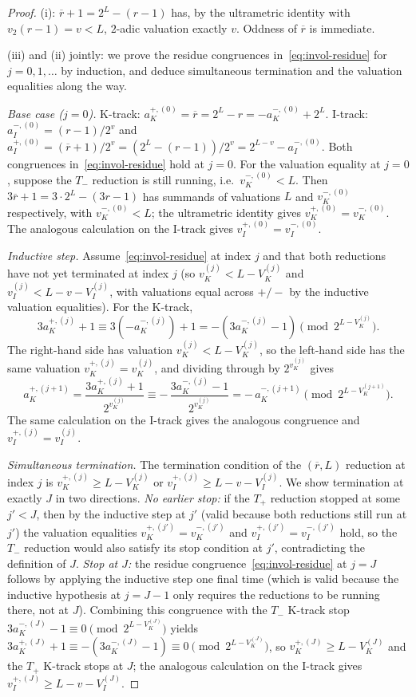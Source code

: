 \documentclass[11pt,reqno]{amsart}
\theoremstyle{plain}
\theoremstyle{definition}
\theoremstyle{remark}
\newcommand{\Tplus}{T_{+}}
\newcommand{\Tminus}{T_{-}}
\newcommand{\Vk}{V_{K}}
\newcommand{\Vi}{V_{I}}
\newcommand{\vk}{v_{K}}
\newcommand{\vi}{v_{I}}
\newcommand{\vtwo}{v_{2}}
\begin{document}
\begin{proof}
(i): $\overline{r} + 1 = 2^L - (r - 1)$ has, by the ultrametric identity
with $\vtwo(r-1) = v < L$, $2$-adic valuation exactly $v$. Oddness of
$\overline{r}$ is immediate.

(iii) and (ii) jointly: we prove the residue congruences
in~\eqref{eq:invol-residue} for $j = 0, 1, \ldots$ by induction, and
deduce simultaneous termination and the valuation equalities along the
way.

\emph{Base case ($j = 0$).} K-track:
$a_K^{+,(0)} = \overline{r} = 2^L - r = -a_K^{-,(0)} + 2^L$.
I-track: $a_I^{-,(0)} = (r-1)/2^v$ and
$a_I^{+,(0)} = (\overline{r}+1)/2^v = (2^L - (r-1))/2^v = 2^{L-v} - a_I^{-,(0)}$.
Both congruences in~\eqref{eq:invol-residue} hold at $j = 0$. For the
valuation equality at $j = 0$, suppose the $\Tminus$ reduction is still
running, i.e.\ $\vk^{-,(0)} < L$. Then
$3 \overline{r} + 1 = 3 \cdot 2^L - (3 r - 1)$ has summands of
valuations $L$ and $\vk^{-,(0)}$ respectively, with $\vk^{-,(0)} < L$;
the ultrametric identity gives $\vk^{+,(0)} = \vk^{-,(0)}$. The
analogous calculation on the I-track gives $\vi^{+,(0)} = \vi^{-,(0)}$.

\emph{Inductive step.} Assume~\eqref{eq:invol-residue} at index $j$ and
that both reductions have not yet terminated at index $j$
(so $\vk^{(j)} < L - \Vk^{(j)}$ and $\vi^{(j)} < L - v - \Vi^{(j)}$,
with valuations equal across $+/-$ by the inductive valuation
equalities). For the K-track,
\[
3 a_K^{+,(j)} + 1 \equiv 3 (-a_K^{-,(j)}) + 1 = -(3 a_K^{-,(j)} - 1)
\pmod{2^{L - \Vk^{(j)}}}.
\]
The right-hand side has valuation $\vk^{(j)} < L - \Vk^{(j)}$, so the
left-hand side has the same valuation $\vk^{+,(j)} = \vk^{(j)}$, and
dividing through by $2^{\vk^{(j)}}$ gives
\[
a_K^{+,(j+1)} = \frac{3 a_K^{+,(j)} + 1}{2^{\vk^{(j)}}}
\equiv -\, \frac{3 a_K^{-,(j)} - 1}{2^{\vk^{(j)}}}
= -\, a_K^{-,(j+1)}
\pmod{2^{L - \Vk^{(j+1)}}}.
\]
The same calculation on the I-track gives the analogous congruence and
$\vi^{+,(j)} = \vi^{(j)}$.

\emph{Simultaneous termination.} The termination condition of the
$(\overline{r}, L)$ reduction at index $j$ is
$\vk^{+,(j)} \ge L - \Vk^{(j)}$ or $\vi^{+,(j)} \ge L - v - \Vi^{(j)}$.
We show termination at exactly $J$ in two directions. \emph{No earlier
stop:} if the $\Tplus$ reduction stopped at some $j' < J$, then by the
inductive step at $j'$ (valid because both reductions still run at $j'$)
the valuation equalities $\vk^{+,(j')} = \vk^{-,(j')}$ and
$\vi^{+,(j')} = \vi^{-,(j')}$ hold, so the $\Tminus$ reduction would
also satisfy its stop condition at $j'$, contradicting the definition
of $J$. \emph{Stop at $J$:} the residue congruence~\eqref{eq:invol-residue}
at $j = J$ follows by applying the inductive step one final time (which
is valid because the inductive hypothesis at $j = J - 1$ only requires
the reductions to be running there, not at $J$). Combining this
congruence with the $\Tminus$ K-track stop
$3 a_K^{-,(J)} - 1 \equiv 0 \pmod{2^{L - \Vk^{(J)}}}$ yields
$3 a_K^{+,(J)} + 1 \equiv -(3 a_K^{-,(J)} - 1) \equiv 0 \pmod{2^{L - \Vk^{(J)}}}$,
so $\vk^{+,(J)} \ge L - \Vk^{(J)}$ and the $\Tplus$ K-track stops at $J$;
the analogous calculation on the I-track gives
$\vi^{+,(J)} \ge L - v - \Vi^{(J)}$.


\end{proof}
\end{document}
